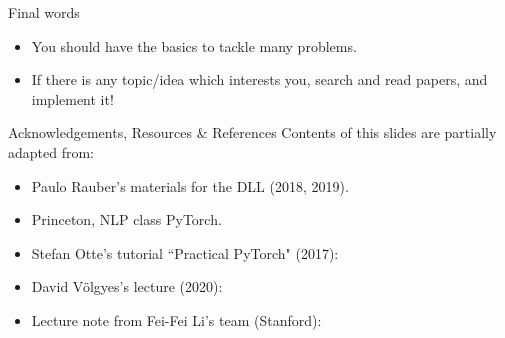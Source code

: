 \begin{frame}{Final words}
\begin{itemize} 
\item You should have the basics to tackle many problems.
\item If there is any topic/idea which interests you, search and read papers, and implement it!
\end{itemize}
\end{frame}

\begin{frame}{Acknowledgements, Resources \& References}
Contents of this slides are partially adapted from:
\vsp
\begin{itemize}
\item Paulo Rauber's materials for the DLL (2018, 2019). 
\item Princeton, NLP class PyTorch.
\item Stefan Otte's tutorial ``Practical PyTorch" (2017):
\item David V\"olgyes's lecture (2020):
\item Lecture note from Fei-Fei Li's team (Stanford):
\end{itemize}
\end{frame}